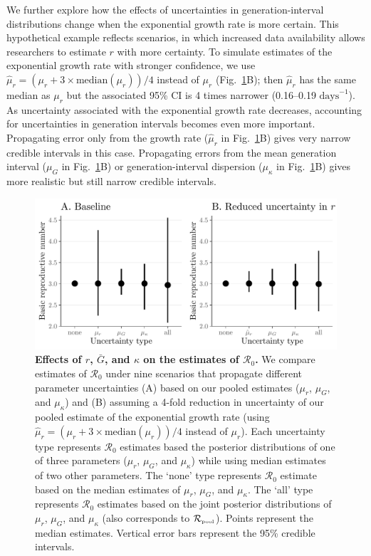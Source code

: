 \documentclass[12pt]{article}
\newcommand{\fref}[1]{Fig.~\ref{fig:#1}}
\newcommand{\Ro}{\ensuremath{{\mathcal R}_{0}}\xspace}
\newcommand{\Rpool}{\ensuremath{{\mathcal R}_{\textrm{\tiny{pool}}}}\xspace}
\begin{document}
We further explore how the effects of uncertainties in generation-interval distributions change when the exponential growth rate is more certain.
This hypothetical example reflects scenarios, in which increased data availability allows researchers to estimate $r$ with more certainty.
To simulate estimates of the exponential growth rate with stronger confidence, we use $\hat{\mu}_r = (\mu_r + 3\times\mathrm{median}(\mu_r))/4$ instead of $\mu_r$ (\fref{eff}B); 
then $\hat{\mu}_r$ has the same median as $\mu_r$ but the associated 95\% CI is 4 times narrower (0.16--0.19 $\textrm{days}^{-1}$).
As uncertainty associated with the exponential growth rate decreases, accounting for uncertainties in generation intervals becomes even more important.
Propagating error only from the growth rate ($\hat{\mu}_r$ in \fref{eff}B) gives very narrow credible intervals in this case. 
Propagating errors from the mean generation interval ($\mu_G$ in \fref{eff}B) or generation-interval dispersion ($\mu_\kappa$ in \fref{eff}B) gives more realistic but still narrow credible intervals.

\begin{figure}[!ht]
\includegraphics[width=\textwidth]{figure2.pdf}
\caption{
  \textbf{Effects of $r$, $\bar G$, and $\kappa$ on the estimates of \Ro.}
We compare estimates of \Ro under nine scenarios that propagate different parameter uncertainties (A) based on our pooled estimates ($\mu_r$, $\mu_G$, and $\mu_\kappa$) and (B) assuming a 4-fold reduction in uncertainty of our pooled estimate of the exponential growth rate (using $\hat{\mu}_r = (\mu_r + 3\times\mathrm{median}(\mu_r))/4$ instead of $\mu_r$).
Each uncertainty type represents \Ro estimates based the posterior distributions of one of three parameters ($\mu_r$, $\mu_G$, and $\mu_\kappa$) while using median estimates of two other parameters.
The `none' type represents \Ro estimate based on the median estimates of $\mu_r$, $\mu_G$, and $\mu_\kappa$.
The `all' type represents \Ro estimates based on the joint posterior distributions of  $\mu_r$, $\mu_G$, and $\mu_\kappa$ (also corresponds to \Rpool).
Points represent the median estimates.
Vertical error bars represent the 95\% credible intervals.
}
\label{fig:eff}
\end{figure}
\end{document}
